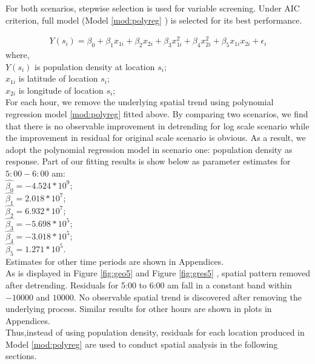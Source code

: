 \documentclass[hidelinks,12pt]{article}
\begin{document}
For both scenarios, stepwise selection is used for variable screening. Under AIC criterion, full model (Model \ref{mod:polyreg} ) is selected for its best performance.

\begin{align}
\label{mod:polyreg}
Y(s_i)=\beta_0 +\beta_1x_{1i} +\beta_2x_{2i} +\beta_3x_{1i}^2 +\beta_4x_{2i}^2+\beta_5x_{1i}x_{2i}+\epsilon_i
\end{align}
where,\\
$Y(s_i)$ is population density at location $s_i$;\\
$x_{1i}$ is latitude of location $s_i$;\\
$x_{2i}$ is longitude of location $s_i$;\\



For each hour, we remove the underlying spatial trend using polynomial regression model \ref{mod:polyreg} fitted above. By comparing two scenarios, we find that there is no observable improvement in detrending for log scale scenario while the improvement in residual for original scale scenario is obvious. As a result, we adopt the polynomial regression model in scenario one: population density as response. Part of our fitting results is show below as parameter estimates for $5:00-6:00$ am:\\
\indent $\hat{\beta_0}=-4.524*10^9$;\\
\indent$\hat{\beta_1}=2.018*10^7$;\\
\indent$\hat{\beta_2}=6.932*10^7$;\\
\indent$\hat{\beta_3}=-5.698*10^5$;\\
\indent$\hat{\beta_4}=-3.018*10^5$;\\
\indent$\hat{\beta_5}=1.271*10^5$.\\
Estimates for other time periods are shown in Appendices.\\

As is displayed in Figure \ref{fig:geo5} and Figure \ref{fig:gres5} , spatial pattern removed after detrending. Residuals for 5:00 to 6:00 am fall in a constant band within $-10000$ and  $10000$. No observable spatial trend is discovered after removing the underlying process. Similar results for other hours are shown in plots in Appendices.\\

Thus,instead of using population density, residuals for each location produced in Model \ref{mod:polyreg} are used to conduct spatial analysis in the following sections.
\end{document}
